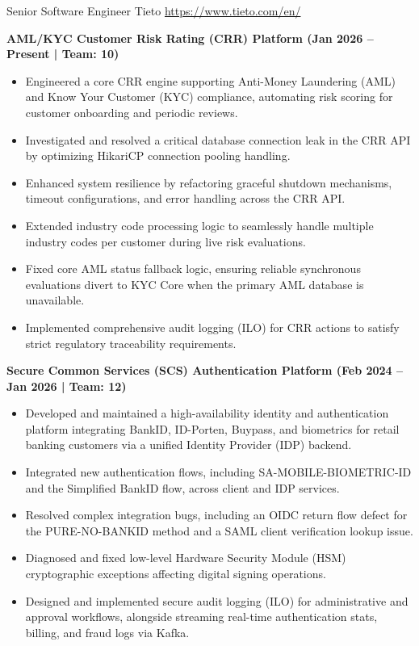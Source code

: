 \documentclass[a4paper, serif, 11pt]{moderncv}
\begin{document}
        {Senior Software Engineer}
        {Tieto}
        {\url{https://www.tieto.com/en/}}
        {}
        {\textbf{AML/KYC Customer Risk Rating (CRR) Platform (Jan 2026 – Present | Team: 10)}
%
\begin{itemize}
\item Engineered a core CRR engine supporting Anti-Money Laundering (AML) and Know Your Customer (KYC) compliance, automating risk scoring for customer onboarding and periodic reviews.
\item Investigated and resolved a critical database connection leak in the CRR API by optimizing HikariCP connection pooling handling.
\item Enhanced system resilience by refactoring graceful shutdown mechanisms, timeout configurations, and error handling across the CRR API.
\item Extended industry code processing logic to seamlessly handle multiple industry codes per customer during live risk evaluations.
\item Fixed core AML status fallback logic, ensuring reliable synchronous evaluations divert to KYC Core when the primary AML database is unavailable.
\item Implemented comprehensive audit logging (ILO) for CRR actions to satisfy strict regulatory traceability requirements.
\end{itemize}
\textbf{Secure Common Services (SCS) Authentication Platform (Feb 2024 – Jan 2026 | Team: 12)}
%
\begin{itemize}
\item Developed and maintained a high-availability identity and authentication platform integrating BankID, ID-Porten, Buypass, and biometrics for retail banking customers via a unified Identity Provider (IDP) backend.
\item Integrated new authentication flows, including SA-MOBILE-BIOMETRIC-ID and the Simplified BankID flow, across client and IDP services.
\item Resolved complex integration bugs, including an OIDC return flow defect for the PURE-NO-BANKID method and a SAML client verification lookup issue.
\item Diagnosed and fixed low-level Hardware Security Module (HSM) cryptographic exceptions affecting digital signing operations.
\item Designed and implemented secure audit logging (ILO) for administrative and approval workflows, alongside streaming real-time authentication stats, billing, and fraud logs via Kafka.
\end{itemize}}
\end{document}
